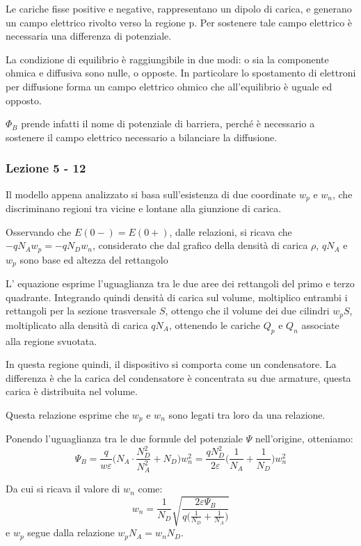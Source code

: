 \documentclass[../template]{subfiles}
\begin{document}
Le cariche fisse positive e negative, rappresentano un dipolo di carica, e generano un campo elettrico rivolto verso la regione p.
Per sostenere tale campo elettrico è necessaria una differenza di potenziale.

La condizione di equilibrio è raggiungibile in due modi: o sia la componente ohmica e diffusiva sono nulle, o opposte.
In particolare lo spostamento di elettroni per diffusione forma un campo elettrico ohmico che all'equilibrio è uguale ed opposto.

$\Phi_B$ prende infatti il nome di potenziale di barriera, perché è necessario a sostenere il campo elettrico necessario a bilanciare la diffusione.

\subsubsection{Lezione 5 - 12}
Il modello appena analizzato si basa sull'esistenza di due coordinate $w_p$ e $w_n$, che discriminano regioni tra vicine e lontane alla giunzione di carica.

Osservando che $E(0-) = E(0+)$, dalle relazioni, si ricava che $-qN_A w_p = -qN_D w_n$, considerato che dal grafico della densità di carica $\rho$, $qN_A$ e $w_p$ sono base ed altezza del rettangolo

L' equazione esprime l'uguaglianza tra le due aree dei rettangoli del primo e terzo quadrante.
Integrando quindi densità di carica sul volume, moltiplico entrambi i rettangoli per la sezione trasversale $S$, ottengo che il volume dei due cilindri $w_p S$, moltiplicato alla densità di carica $qN_A$, ottenendo le cariche $Q_p$ e $Q_n$ associate alla regione svuotata.

In questa regione quindi, il dispositivo si comporta come un condensatore. La differenza è che la carica del condensatore è concentrata su due armature, questa carica è distribuita nel volume.

Questa relazione esprime che $w_p$ e $w_n$ sono legati tra loro da una relazione.


Ponendo l'uguaglianza tra le due formule del potenziale $\Psi$ nell'origine, otteniamo:
\[
    \Psi_B = \frac{q}{w \varepsilon} \big(N_A \cdot \frac{N_D^2}{N_A^2} + N_D \big) w_n^2 = \frac{qN_D^2}{2\varepsilon} \big( \frac{1}{N_A} + \frac{1}{N_D} \big) w_n^2
\]

Da cui si ricava il valore di $w_n$ come:
\[
w_n = \frac{1}{N_D} \sqrt{\frac{2\varepsilon \Psi_B}{q\big(\frac{1}{N_D} + \frac{1}{N_A}\big)}}
\]
e $w_p$ segue dalla relazione $w_p N_A = w_n N_D$.
\end{document}

